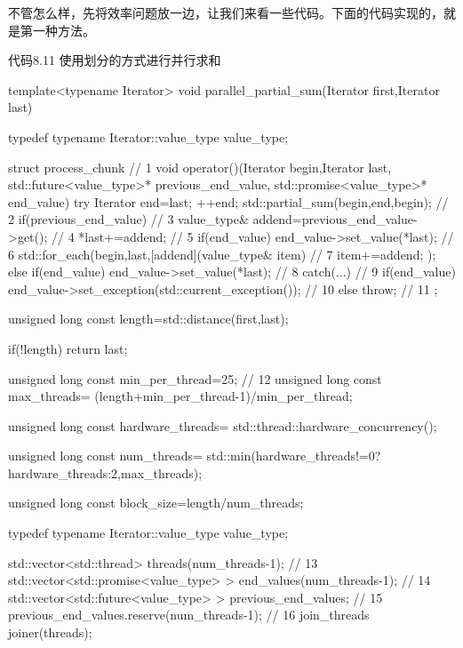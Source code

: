 不管怎么样，先将效率问题放一边，让我们来看一些代码。下面的代码实现的，就是第一种方法。

代码8.11 使用划分的方式进行并行求和

\begin{cpp}
template<typename Iterator>
void parallel_partial_sum(Iterator first,Iterator last)
{
  typedef typename Iterator::value_type value_type;

  struct process_chunk  // 1
  {
    void operator()(Iterator begin,Iterator last,
                    std::future<value_type>* previous_end_value,
                    std::promise<value_type>* end_value)
    {
      try
      {
        Iterator end=last;
        ++end;
        std::partial_sum(begin,end,begin);  // 2
        if(previous_end_value)  // 3
        {
          value_type& addend=previous_end_value->get();  // 4
          *last+=addend;  // 5
          if(end_value)
          {
            end_value->set_value(*last);  // 6
          }
          std::for_each(begin,last,[addend](value_type& item)  // 7
                        {
                          item+=addend;
                        });
         }
         else if(end_value)
         {
           end_value->set_value(*last);  // 8
         }
       }
       catch(...)  // 9
       {
         if(end_value)
         {
           end_value->set_exception(std::current_exception());  // 10
         }
         else
         {
           throw;  // 11
         }
       }
     }
   };

  unsigned long const length=std::distance(first,last);

  if(!length)
    return last;

  unsigned long const min_per_thread=25;  // 12
  unsigned long const max_threads=
    (length+min_per_thread-1)/min_per_thread;

  unsigned long const hardware_threads=
    std::thread::hardware_concurrency();

  unsigned long const num_threads=
    std::min(hardware_threads!=0?hardware_threads:2,max_threads);

  unsigned long const block_size=length/num_threads;

  typedef typename Iterator::value_type value_type;

  std::vector<std::thread> threads(num_threads-1);  // 13
  std::vector<std::promise<value_type> >
    end_values(num_threads-1);  // 14
  std::vector<std::future<value_type> >
    previous_end_values;  // 15
  previous_end_values.reserve(num_threads-1);  // 16
  join_threads joiner(threads);

}
\end{cpp}
